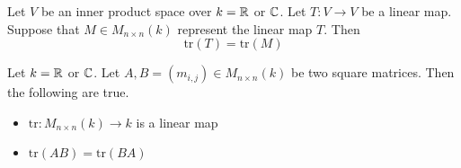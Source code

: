 \documentclass[a4paper]{article}
\begin{document}
\begin{prp}{}{} Let $V$ be an inner product space over $k=\mathbb{R}$ or $\mathbb{C}$. Let $T:V\to V$ be a linear map. Suppose that $M\in M_{n\times n}(k)$ represent the linear map $T$. Then $$\text{tr}(T)=\text{tr}(M)$$
\end{prp}

\begin{lmm}{}{} Let $k=\mathbb{R}$ or $\mathbb{C}$. Let $A,B=(m_{i,j})\in M_{n\times n}(k)$ be two square matrices. Then the following are true. 
\begin{itemize}
\item $\text{tr}:M_{n\times n}(k)\to k$ is a linear map
\item $\text{tr}(AB)=\text{tr}(BA)$
\end{itemize}
\end{lmm}
\end{document}
